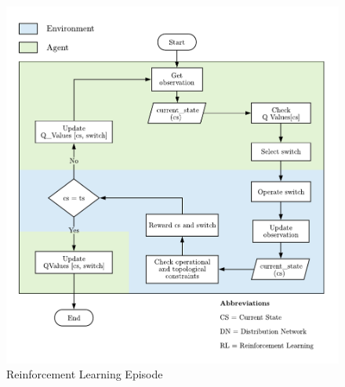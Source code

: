 \begin{figure}[!ht]
    \centering
    \includegraphics[scale=0.7]{_chapter1/fig/rl_episodes.pdf}
    \caption{Reinforcement Learning Episode}
    \label{ch1:fig:rl_episode_blocks}
\end{figure}